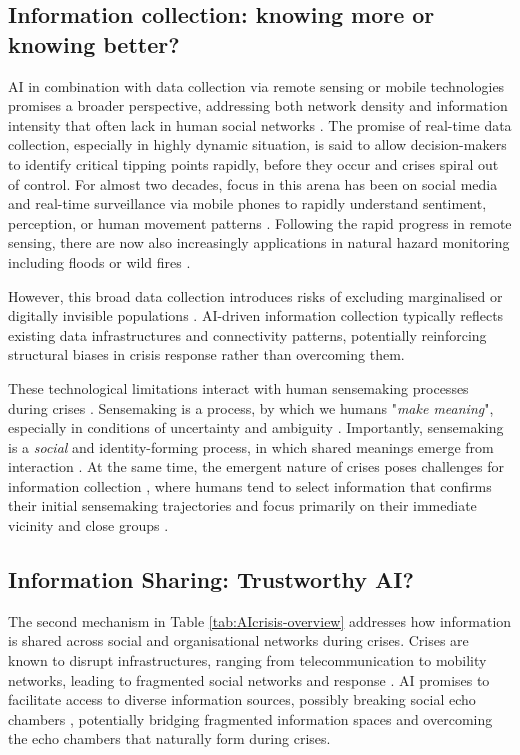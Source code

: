 \documentclass[pdflatex,sn-apa]{sn-jnl}%
\begin{document}
\subsection{Information collection: knowing more or knowing better?}
AI in combination with data collection via remote sensing or mobile technologies promises a broader perspective, addressing both network density and information intensity that often lack in human social networks \citep{pan2012crisis}. The promise of real-time data collection, especially in highly dynamic situation, is said to allow decision-makers to identify critical tipping points rapidly, before they occur and crises spiral out of control. For almost two decades, focus in this arena has been on social media and real-time surveillance via mobile phones to rapidly understand sentiment, perception, or human movement patterns \citep{middleton2013real, qadir2016crisis, mai2025evaluating}. Following the rapid progress in remote sensing, there are now also increasingly applications in natural hazard monitoring including floods \citep{zhou2024threshold} or wild fires \citep{roy2024multi}.

However, this broad data collection introduces risks of excluding marginalised or digitally invisible populations \citep{coleman2024weaving}. AI-driven information collection typically reflects existing data infrastructures and connectivity patterns, potentially reinforcing structural biases in crisis response rather than overcoming them.

These technological limitations interact with human sensemaking processes during crises \citep{klein2010rapid}. Sensemaking is a process, by which we humans "\textit{make meaning}", especially in conditions of uncertainty and ambiguity \citep{weick2005organizing}. Importantly, sensemaking is a \textit{social} and identity-forming process, in which shared meanings emerge from interaction \citep{maitlis2010sensemaking}. At the same time, the emergent nature of crises poses challenges for information collection \citep{turoff2004design}, where humans tend to  select information that confirms their initial sensemaking trajectories \citep{barbera2015tweeting} and focus primarily on their immediate vicinity and close groups \citep{comes2020coordination}.

\subsection{Information Sharing: Trustworthy AI?}
The second mechanism in Table \ref{tab:AIcrisis-overview} addresses how information is shared across social and organisational networks during crises. Crises are known to disrupt infrastructures, ranging from telecommunication to mobility networks, leading to fragmented social networks and response \citep{holguin2012unique}. AI promises to facilitate access to diverse information sources, possibly breaking social echo chambers \citep{jeon2024hearhere}, potentially bridging fragmented information spaces and overcoming the echo chambers that naturally form during crises.
\end{document}

